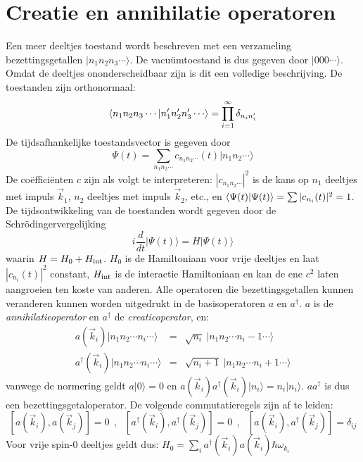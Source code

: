 \documentclass[twoside]{report}
\begin{document}
\section[~~Creatie en annihilatie operatoren]{Creatie en annihilatie operatoren}
Een meer deeltjes toestand wordt beschreven met een verzameling
bezettingsgetallen $|n_1n_2n_3\cdots\rangle$. De vacu\"umtoestand is dus
gegeven door $|000\cdots\rangle$. Omdat de deeltjes ononderscheidbaar zijn is
dit een volledige beschrijving. De toestanden zijn orthonormaal:
\[
\av{n_1n_2n_3\cdots|n_1'n_2'n_3'\cdots}=\prod_{i=1}^\infty\delta_{n_in_i'}
\]
De tijdsafhankelijke toestandsvector is gegeven door
\[
\Psi(t)=\sum_{n_1n_2\cdots}c_{n_1n_2\cdots}(t)|n_1n_2\cdots\rangle
\]
De co\"effici\"enten $c$ zijn als volgt te interpreteren:
$|c_{n_1n_2\cdots}|^2$ is de kans op $n_1$ deeltjes met impuls $\vec{k}_1$,
$n_2$ deeltjes met impuls $\vec{k}_2$, etc., en
$\left\langle \Psi(t)|\Psi(t) \right\rangle=\sum|c_{n_i}(t)|^2=1$. De tijdsontwikkeling van de
toestanden wordt gegeven door de Schr\"odingervergelijking
\[
i\frac{d}{dt}|\Psi(t)\rangle=H|\Psi(t)\rangle
\]
waarin $H=H_0+H_{\rm int}$. $H_0$ is de Hamiltoniaan voor vrije deeltjes en
laat $|c_{n_i}(t)|^2$ constant, $H_{\rm int}$ is de interactie Hamiltoniaan en
kan de ene $c^2$ laten aangroeien ten koste van anderen.
\npar
Alle operatoren die bezettingsgetallen kunnen veranderen kunnen worden
uitgedrukt in de basisoperatoren $a$ en $a^\dagger$. $a$ is de
{\it annihilatieoperator} en $a^\dagger$ de {\it creatieoperator}, en:
\begin{eqnarray*}
a(\vec{k}_i)|n_1n_2\cdots n_i\cdots\rangle&=&\sqrt{n_i}~|n_1n_2\cdots n_i-1\cdots\rangle\\
a^\dagger(\vec{k}_i)|n_1n_2\cdots n_i\cdots\rangle&=&\sqrt{n_i+1}~|n_1n_2\cdots n_i+1\cdots\rangle
\end{eqnarray*}
vanwege de normering geldt $a|0\rangle=0$ en
$a(\vec{k}_i)a^\dagger(\vec{k}_i)|n_i\rangle=n_i|n_i\rangle$. $aa^\dagger$ is
dus een bezettingsgetaloperator. De volgende commutatieregels zijn af te
leiden:
\[
[a(\vec{k}_i),a(\vec{k}_j)]=0~~,~~~
[a^\dagger(\vec{k}_i),a^\dagger(\vec{k}_j)]=0~~,~~~
[a(\vec{k}_i),a^\dagger(\vec{k}_j)]=\delta_{ij}
\]
Voor vrije spin-0 deeltjes geldt dus:
$H_0=\sum\limits_i a^\dagger(\vec{k}_i)a(\vec{k}_i)\hbar\omega_{k_i}$
\end{document}
